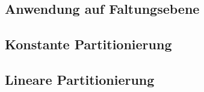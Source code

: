 

\subsection{Anwendung auf Faltungsebene}



\subsection{Konstante Partitionierung}

\subsection{Lineare Partitionierung}







